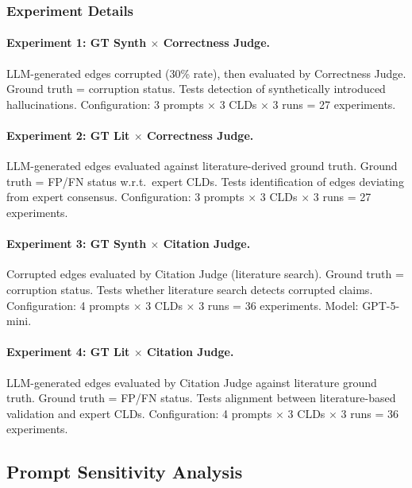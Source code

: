 \subsubsection{Experiment Details}

\paragraph{Experiment 1: GT Synth $\times$ Correctness Judge.}
LLM-generated edges corrupted (30\% rate), then evaluated by Correctness Judge. Ground truth = corruption status. Tests detection of synthetically introduced hallucinations. Configuration: 3 prompts $\times$ 3 CLDs $\times$ 3 runs = 27 experiments.

\paragraph{Experiment 2: GT Lit $\times$ Correctness Judge.}
LLM-generated edges evaluated against literature-derived ground truth. Ground truth = FP/FN status w.r.t.\ expert CLDs. Tests identification of edges deviating from expert consensus. Configuration: 3 prompts $\times$ 3 CLDs $\times$ 3 runs = 27 experiments.

\paragraph{Experiment 3: GT Synth $\times$ Citation Judge.}
Corrupted edges evaluated by Citation Judge (literature search). Ground truth = corruption status. Tests whether literature search detects corrupted claims. Configuration: 4 prompts $\times$ 3 CLDs $\times$ 3 runs = 36 experiments. Model: GPT-5-mini.

\paragraph{Experiment 4: GT Lit $\times$ Citation Judge.}
LLM-generated edges evaluated by Citation Judge against literature ground truth. Ground truth = FP/FN status. Tests alignment between literature-based validation and expert CLDs. Configuration: 4 prompts $\times$ 3 CLDs $\times$ 3 runs = 36 experiments.

\subsection{Prompt Sensitivity Analysis}
\label{sec:rq1a_sensitivity}

